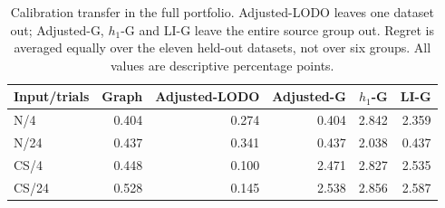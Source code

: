 \begin{table}[tbp]
\centering
\caption{Calibration transfer in the full portfolio. Adjusted-LODO leaves one dataset out; Adjusted-G, $h_1$-G and LI-G leave the entire source group out. Regret is averaged equally over the eleven held-out datasets, not over six groups. All values are descriptive percentage points.}
\label{tab:source_group_main}
\small
\setlength{\tabcolsep}{3pt}
\begin{tabular}{@{}lrrrrr@{}}
\toprule
Input/trials & Graph & Adjusted-LODO & Adjusted-G & $h_1$-G & LI-G \\
\midrule
N/4 & 0.404 & 0.274 & 0.404 & 2.842 & 2.359 \\
N/24 & 0.437 & 0.341 & 0.437 & 2.038 & 0.437 \\
CS/4 & 0.448 & 0.100 & 2.471 & 2.827 & 2.535 \\
CS/24 & 0.528 & 0.145 & 2.538 & 2.856 & 2.587 \\
\bottomrule
\end{tabular}
\end{table}
